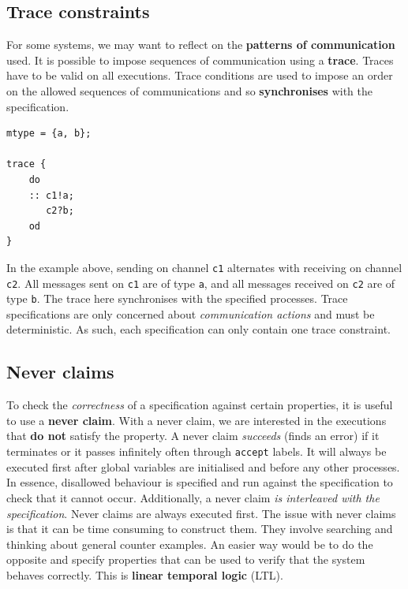 \documentclass[11pt]{article}
\begin{document}
\subsection{Trace constraints}
For some systems, we may want to reflect on the \textbf{patterns of communication} used. It is possible to impose sequences of communication using a \textbf{trace}. Traces have to be valid on all executions. Trace conditions are used to impose an order on the allowed sequences of communications and so \textbf{synchronises} with the specification. 
\\
\begin{lstlisting}[caption={Example of a trace in PROMELA}, captionpos=b]
mtype = {a, b};

trace {
	do
	:: c1!a;
	   c2?b;
	od
}
\end{lstlisting}
\noindent
In the example above, sending on channel \texttt{c1} alternates with receiving on channel \texttt{c2}. All messages sent on \texttt{c1} are of type \texttt{a}, and all messages received on \texttt{c2} are of type \texttt{b}. The trace here synchronises with the specified processes.
\n
Trace specifications are only concerned about \textit{communication actions} and must be deterministic. As such, each specification can only contain one trace constraint. 
\subsection{Never claims}
To check the \textit{correctness} of a specification against certain properties, it is useful to use a \textbf{never claim}. With a never claim, we are interested in the executions that \textbf{do not} satisfy the property. A never claim \textit{succeeds} (finds an error) if it terminates or it passes infinitely often through \texttt{accept} labels. It will always be executed first after global variables are initialised and before any other processes.
\n
In essence, disallowed behaviour is specified and run against the specification to check that it cannot occur. Additionally, a never claim \textit{is interleaved with the specification}. Never claims are always executed first.
\n
The issue with never claims is that it can be time consuming to construct them. They involve searching and thinking about general counter examples. An easier way would be to do the opposite and specify properties that can be used to verify that the system behaves correctly. This is \textbf{linear temporal logic} (LTL).
\end{document}
